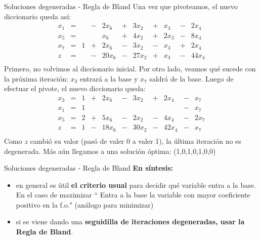 \documentclass[10pt, aspectratio=169]{beamer}
\begin{document}
\begin{frame}{Soluciones degeneradas - Regla de Bland}
    \small
    Una vez que pivoteamos, el nuevo diccionario queda así:
    \[
        \begin{array}{rrrrrrrrrrr}
            x_1 & = &   & - & 2x_6  & + & 3x_2  & + & x_3  & - & 2x_4  \\
            x_5 & = &   &   & x_6   & + & 4x_2  & + & 2x_3 & - & 8x_4  \\
            x_7 & = & 1 & + & 2x_6  & - & 3x_2  & - & x_3  & + & 2x_4  \\ \hline
            z   & = &   & - & 20x_6 & - & 27x_2 & + & x_3  & - & 44x_4 \\
        \end{array}
    \]
    \pause
    Primero, no volvimos al diccionario inicial. Por otro lado, veamos qué sucede con la próxima iteración: $x_3$
    entrará a la base y $x_7$ saldrá de la base. Luego de efectuar el pivote, el nuevo diccionario queda:
    \[
        \begin{array}{rrrrrrrrrrr}
            x_3 & = & 1 & + & 2x_6  & - & 3x_2  & + & 2x_4  & - & x_7  \\
            x_1 & = & 1 &   &       &   &       &   &       & - & x_7  \\
            x_5 & = & 2 & + & 5x_6  & - & 2x_2  & - & 4x_4  & - & 2x_7 \\ \hline
            z   & = & 1 & - & 18x_6 & - & 30x_2 & - & 42x_4 & - & x_7  \\
        \end{array}
    \]
    Como $z$
    cambió su valor (pasó de valer 0 a valer 1), la última iteración no es degenerada. Más aún llegamos a una solución
    óptima: (1,0,1,0,1,0,0)
    \vskip 0.3cm
\end{frame}

\begin{frame}{Soluciones degeneradas - Regla de Bland}
    \textbf{En síntesis:}
    \begin{itemize}
        \item en general es útil \textbf{el criterio usual}
        para decidir qué variable entra a la base. En el caso de maximizar \textquotedblleft
        Entra a la base la variable con mayor coeficiente positivo en la f.o." (análogo para minimizar)
        \item si se viene dando una \textbf{seguidilla de iteraciones degeneradas, usar la Regla de Bland}.
    \end{itemize}
\end{frame}
\end{document}
